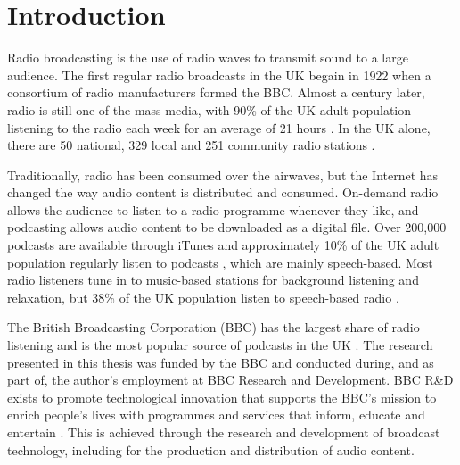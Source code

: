 \chapter{Introduction}\label{chp:intro}

Radio broadcasting is the use of radio waves to transmit sound to a large audience.  The first regular radio broadcasts
in the UK begain in 1922 when a consortium of radio manufacturers formed the BBC.
Almost a century later, radio is still one of the mass media, with 90\% of the UK adult population listening to the
radio each week for an average of 21 hours \citep{RAJAR2017a}.  In the UK alone, there are 50 national, 329 local and
251 community radio stations \citep[pp. 6, 127]{Ofcom2017}.

Traditionally, radio has been consumed over the airwaves, but the Internet has changed the way audio content is
distributed and consumed.  On-demand radio allows the audience to listen to a radio programme whenever they like, and
podcasting allows audio content to be downloaded as a digital file. Over 200,000 podcasts are available through iTunes
\citep{Morgan2015} and approximately 10\% of the UK adult population regularly listen to podcasts \citep{RAJAR2017},
which are mainly speech-based.  Most radio listeners tune in to music-based stations for background listening and
relaxation, but 38\% of the UK population listen to speech-based radio \citep[pp.  97, 105]{Ofcom2017}.

The British Broadcasting Corporation (BBC) has the largest share of radio listening and is the most popular source of
podcasts in the UK \citep[p. 107]{Ofcom2017}.
The research presented in this thesis was funded by the BBC and conducted during, and as part of, the author's
employment at BBC Research and Development.  BBC R\&D exists to promote technological innovation that supports the
BBC's mission to enrich people's lives with programmes and services that inform, educate and entertain \citep[art.
15]{BBCCharter2016}.  This is achieved through the research and development of broadcast technology, including for the
production and distribution of audio content.

